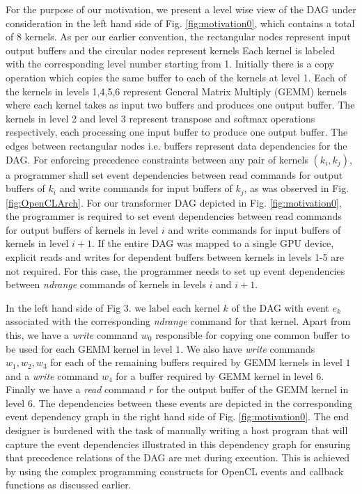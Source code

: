 	\par For the purpose of our motivation, we present a level wise view of the DAG under consideration  in the left hand side of Fig. \ref{fig:motivation0}, which contains a total of 8 kernels. As per our earlier convention, the rectangular nodes represent input output buffers and the circular nodes represent kernels Each kernel is labeled with the corresponding level number starting from 1. Initially there is a copy operation which copies the same buffer to each of the kernels at level 1.  Each of the kernels in levels 1,4,5,6 represent General Matrix Multiply (GEMM) kernels where each kernel takes as input two buffers and produces one output buffer. The kernels in level 2 and level 3 represent transpose and softmax operations respectively, each processing one input buffer to produce one output buffer. The edges between rectangular nodes i.e. buffers represent data dependencies for the DAG. For enforcing precedence constraints between any pair of  kernels $(k_i,k_j)$, a 
	programmer shall set event dependencies between read commands for output buffers of $k_i$ and write commands for input buffers of $k_j$, as was observed in Fig. \ref{fig:OpenCLArch}.  
	For our transformer DAG depicted in Fig. \ref{fig:motivation0}, the programmer is required to set event dependencies between read commands for output buffers of kernels in level $i$ and write commands for input buffers of kernels in level $i+1$. If the entire DAG was mapped to a single GPU device, explicit reads and writes for dependent buffers between kernels in levels 1-5 are not required. For this case, the programmer needs to set up event dependencies between \textit{ndrange} commands of kernels in levels $i$ and $i+1$. 
	\par In the left hand side of Fig 3. we label each kernel $k$ of the DAG with event $e_k$ associated with the corresponding \textit{ndrange} command for that kernel. Apart from this, we have a \textit{write} command $w_0$ responsible for copying one common buffer to be used for each GEMM kernel in level $1$. We also have \textit{write} commands $w_1,w_2,w_3$ for each of the remaining buffers required by GEMM kernels in level $1$ and a \textit{write} command $w_4$ for a buffer required by GEMM kernel in level $6$. Finally we have a \textit{read} command $r$ for the output buffer of the GEMM kernel in level $6$. The dependencies between these events are depicted in the corresponding event dependency graph in the right hand side of Fig. \ref{fig:motivation0}. The end designer is burdened with the task of manually writing a host program that will capture the event dependencies illustrated in this dependency graph for ensuring that precedence relations of the DAG are met during execution. This is achieved by using the complex programming constructs for OpenCL events and callback functions as discussed earlier.    
